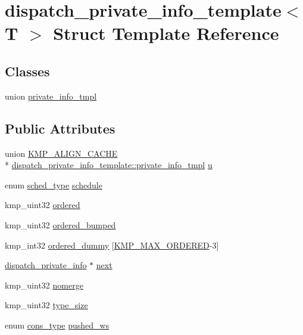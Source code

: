 \hypertarget{structdispatch__private__info__template}{\section{dispatch\-\_\-private\-\_\-info\-\_\-template$<$ T $>$ Struct Template Reference}
\label{structdispatch__private__info__template}
}
\subsection*{Classes}
\begin{DoxyCompactItemize}
\item 
union \hyperlink{uniondispatch__private__info__template_1_1private__info__tmpl}{private\-\_\-info\-\_\-tmpl}
\end{DoxyCompactItemize}
\subsection*{Public Attributes}
\begin{DoxyCompactItemize}
\item 
union \hyperlink{kmp__os_8h_a6830c178a3906c25cd0138d8365db070}{K\-M\-P\-\_\-\-A\-L\-I\-G\-N\-\_\-\-C\-A\-C\-H\-E} \\*
\hyperlink{uniondispatch__private__info__template_1_1private__info__tmpl}{dispatch\-\_\-private\-\_\-info\-\_\-template\-::private\-\_\-info\-\_\-tmpl} \hyperlink{structdispatch__private__info__template_af9721ce0273cf9cfe4674af244007e7b}{u}
\item 
enum \hyperlink{group__WORK__SHARING_gadcaf200537aaa0218a60c398438f81be}{sched\-\_\-type} \hyperlink{structdispatch__private__info__template_afc7085a386a2b7b867aad26bbe8dfea7}{schedule}
\item 
kmp\-\_\-uint32 \hyperlink{structdispatch__private__info__template_a2ab5d627f0ac9025d516a358a1da0101}{ordered}
\item 
kmp\-\_\-uint32 \hyperlink{structdispatch__private__info__template_ac04a2f8dd76f45d3103abd5b070c9924}{ordered\-\_\-bumped}
\item 
kmp\-\_\-int32 \hyperlink{structdispatch__private__info__template_a3fae76529a54da350a12c6767ff85506}{ordered\-\_\-dummy} \mbox{[}\hyperlink{kmp_8h_ab5cc9eb736cfbc3fe74fc2324c0b19be}{K\-M\-P\-\_\-\-M\-A\-X\-\_\-\-O\-R\-D\-E\-R\-E\-D}-\/3\mbox{]}
\item 
\hyperlink{structdispatch__private__info}{dispatch\-\_\-private\-\_\-info} $\ast$ \hyperlink{structdispatch__private__info__template_ae8e55887736b25c568047bbc0f2a84d1}{next}
\item 
kmp\-\_\-uint32 \hyperlink{structdispatch__private__info__template_a173b2536a5a9e9dc1945f77dc0497683}{nomerge}
\item 
kmp\-\_\-uint32 \hyperlink{structdispatch__private__info__template_a34d33703aed7b118cffb529ec6ec49e3}{type\-\_\-size}
\item 
enum \hyperlink{kmp_8h_a1582e7ddc609220a660d10244ef3e315}{cons\-\_\-type} \hyperlink{structdispatch__private__info__template_aae7f21fbe2cebe26a14031af3bf17285}{pushed\-\_\-ws}
\end{DoxyCompactItemize}


